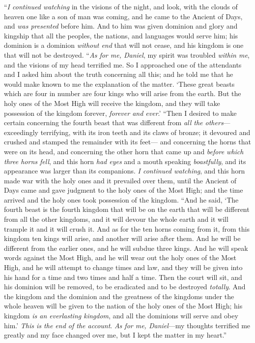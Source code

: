 \begin{biblechapter}
\verse “\textit{I continued watching} in the visions of the night, and look, with the clouds of heaven one like a son of man was coming, and he came to the Ancient of Days, and \textit{was presented} before him.
\verse And to him was given dominion and glory and kingship that all the peoples, the nations, and languages would serve him; his dominion is a dominion \textit{without end} that will not cease, and his kingdom is one that will not be destroyed.
 “\textit{As for me, Daniel}, my spirit was troubled \textit{within me}, and the visions of my head terrified me.
\verse So I approached one of the attendants and I asked him about the truth concerning all this; and he told me that he would make known to me the explanation of the matter.
\verse ‘These great beasts which are four in number are four kings who will arise from the earth.
\verse But the holy ones of the Most High will receive the kingdom, and they will take possession of the kingdom forever, \textit{forever and ever}.’
\verse “Then I desired to make certain concerning the fourth beast that was different from \textit{all the others}—exceedingly terrifying, with its iron teeth and its claws of bronze; it devoured and crushed and stamped the remainder with its feet—
\verse and concerning the horns that were on its head, and concerning the other horn that came up and \textit{before which three horns fell}, and this horn \textit{had eyes} and a mouth speaking \textit{boastfully}, and its appearance was larger than its companions.
\verse \textit{I continued watching}, and this horn made war with the holy ones and it prevailed over them,
\verse until the Ancient of Days came and gave judgment to the holy ones of the Most High; and the time arrived and the holy ones took possession of the kingdom.
\verse “And he said, ‘The fourth beast is the fourth kingdom that will be on the earth that will be different from all the other kingdoms, and it will devour the whole earth and it will trample it and it will crush it.
\verse And as for the ten horns coming from it, from this kingdom ten kings will arise, and another will arise after them. And he will be different from the earlier ones, and he will subdue three kings.
\verse And he will speak words against the Most High, and he will wear out the holy ones of the Most High, and he will attempt to change times and law, and they will be given into his hand for a time and two times and half a time.
\verse Then the court will sit, and his dominion will be removed, to be eradicated and to be destroyed \textit{totally}.
\verse And the kingdom and the dominion and the greatness of the kingdoms under the whole heaven will be given to the nation of the holy ones of the Most High; his kingdom \textit{is an everlasting kingdom}, and all the dominions will serve and obey him.’
\verse \textit{This is the end of the account}. \textit{As for me, Daniel}—my thoughts terrified me greatly and my face changed over me, but I kept the matter in my heart.”
\end{biblechapter}

